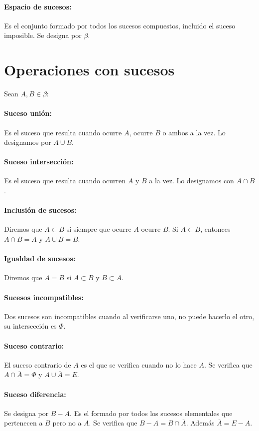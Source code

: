 \documentclass[12pt,a4paper,oneside,onecolumn,titlepage]{book}
\begin{document}
\paragraph{Espacio de sucesos:}
Es el conjunto formado por todos los sucesos compuestos, incluido el suceso imposible. Se designa por $\beta$.


\section{Operaciones con sucesos}
Sean $A,B \in \beta$:
\paragraph{Suceso unión:} Es el suceso que resulta cuando ocurre $A$, ocurre $B$ o ambos a la vez. Lo designamos por $A \cup B$.
\paragraph{Suceso intersección:} Es el suceso que resulta cuando ocurren $A$ y $B$ a la vez. Lo designamos con $A \cap B$.
\paragraph{Inclusión de sucesos:} Diremos que $A \subset B$ si siempre que ocurre $A$ ocurre $B$. Si $A \subset B$, entonces $A \cap B = A$ y $A \cup B = B$.
\paragraph{Igualdad de sucesos:}Diremos que $A = B$ si $A \subset B$ y $B \subset A$.
\paragraph{Sucesos incompatibles:} Dos sucesos son incompatibles cuando al verificarse uno, no puede hacerlo el otro, su intersección es $\Phi$.
\paragraph{Suceso contrario:} El suceso contrario de $A$ es el que se verifica cuando no lo hace $A$. Se verifica que $A \cap \overline{A} = \Phi$ y $A \cup \overline{A} = E$.
\paragraph{Suceso diferencia:} Se designa por $B - A$. Es el formado por todos los sucesos elementales que pertenecen a $B$ pero no a $A$. Se verifica que $B - A = B \cap \overline{A}$. Además $\overline{A} = E - A$.
\end{document}
